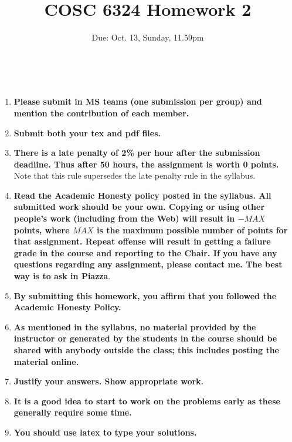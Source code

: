 \documentclass[11pt]{article}
\date{}
\begin{document}
\title{ COSC 6324 Homework 2}
\author{
Due: Oct. 13, Sunday, 11.59pm  \\
 }

 \maketitle

 \\

\begin{enumerate}
\item {\bf Please submit in MS teams (one submission per group)
and mention the contribution of each member.}

\item {\bf Submit both your tex and pdf files.}

\item {\bf There is a late penalty of 2\% per hour after the submission deadline. Thus after 50 hours, the assignment is worth 0 points.} Note that this rule supersedes the late penalty rule in the syllabus.

\item {\bf Read the Academic Honesty policy posted in the syllabus.
All submitted work should be  your own. Copying or using other people's work (including  from the Web) will result in $-MAX$ points, where $MAX$ is the maximum possible number of points for that assignment. Repeat offense will result in getting a failure grade in the course and reporting to the Chair. If you have any questions regarding any assignment, please contact me. The best way is to ask in Piazza}. 

\item {\bf By submitting this homework, you affirm that you followed the Academic Honesty Policy.}

\item {\bf As mentioned in the syllabus, no material provided by the instructor or generated by the students in the course should be shared with anybody outside the class; this includes posting the material online.}

\item {\bf  Justify your answers. Show appropriate work.} 
 
\item {\bf It is a good idea to start to work on the problems early as these generally require some time.} 

\item {\bf You should use latex to type your solutions.}
\end{enumerate}
\end{document}
